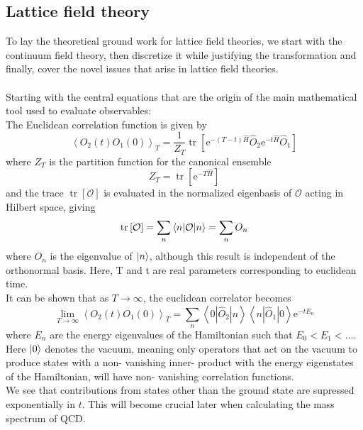 \documentclass[a4paper,10pt]{article}
\begin{document}
\subsection{Lattice field theory}
To lay the theoretical ground work for lattice field theories, we start with the continuum field theory, then discretize it while justifying the transformation and finally, cover the novel issues that arise in lattice field theories.\\\\Starting with the central equations that are the origin of the main mathematical tool used to evaluate observables:\\
The Euclidean correlation function is given by
\begin{equation}\label{eq:first}
\left\langle O_{2}(t) O_{1}(0)\right\rangle_{T}=\frac{1}{Z_{T}} \operatorname{tr}\left[\mathrm{e}^{-(T-t) \hat{H}} \widehat{O}_{2} \mathrm{e}^{-t \hat{H}} \widehat{O}_{1}\right]
\end{equation}
where $Z_T$ is the partition function for the canonical ensemble
\begin{equation}
Z_{T}=\operatorname{tr}\left[\mathrm{e}^{-T \widehat{H}}\right]
\end{equation}
and the trace $\operatorname{tr}\left[\mathcal{O}\right]$ is evaluated in the normalized eigenbasis of $\mathcal{O}$ acting in Hilbert space, giving
\begin{equation}
\operatorname{tr}\left[\mathcal{O}\right] = \sum\limits_n \braket{n|\mathcal{O}|n} = \sum\limits_n O_n
\end{equation}
where $O_n$ is the eigenvalue of $\ket{n}$, although this result is independent of the orthonormal basis. Here, T and t are real parameters corresponding to euclidean time.\\It can be shown that as $T\rightarrow \infty$, the euclidean correlator becomes 
\begin{equation}
\lim _{T \rightarrow \infty}\left\langle O_{2}(t) O_{1}(0)\right\rangle_{T}=\sum_{n}\left\langle 0\left|\widehat{O}_{2}\right| n\right\rangle\left\langle n\left|\widehat{O}_{1}\right| 0\right\rangle \mathrm{e}^{-t E_{n}}
\end{equation}
where $E_{n}$ are the energy eigenvalues of the Hamiltonian such that $E_0 < E_1 <\ldots$. Here $\ket{0}$ denotes the vacuum, meaning only operators that act on the vacuum to produce states with a non- vanishing inner- product with the energy eigenstates of the Hamiltonian, will have non- vanishing correlation functions.\\ We see that contributions from states other than the ground state are supressed exponentially in $t$. This will become crucial later when calculating the mass spectrum of QCD.
\end{document}

